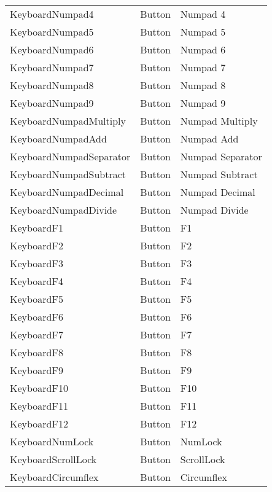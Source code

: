 \begin{center}
\begin{longtable}{ | l | l | p{9cm} |}
	KeyboardNumpad4			&	Button	&	Numpad 4\\
	KeyboardNumpad5			&	Button	&	Numpad 5\\
	KeyboardNumpad6			&	Button	&	Numpad 6\\
	KeyboardNumpad7			&	Button	&	Numpad 7\\
	KeyboardNumpad8			&	Button	&	Numpad 8\\
	KeyboardNumpad9			&	Button	&	Numpad 9\\
	KeyboardNumpadMultiply	&	Button	&	Numpad Multiply\\
	KeyboardNumpadAdd		&	Button	&	Numpad Add\\
	KeyboardNumpadSeparator	&	Button	&	Numpad Separator\\
	KeyboardNumpadSubtract	&	Button	&	Numpad Subtract\\
	KeyboardNumpadDecimal	&	Button	&	Numpad Decimal\\
	KeyboardNumpadDivide	&	Button	&	Numpad Divide\\
	KeyboardF1				&	Button	&	F1\\
	KeyboardF2				&	Button	&	F2\\
	KeyboardF3				&	Button	&	F3\\
	KeyboardF4				&	Button	&	F4\\
	KeyboardF5				&	Button	&	F5\\
	KeyboardF6				&	Button	&	F6\\
	KeyboardF7				&	Button	&	F7\\
	KeyboardF8				&	Button	&	F8\\
	KeyboardF9				&	Button	&	F9\\
	KeyboardF10				&	Button	&	F10\\
	KeyboardF11				&	Button	&	F11\\
	KeyboardF12				&	Button	&	F12\\
	KeyboardNumLock			&	Button	&	NumLock\\
	KeyboardScrollLock		&	Button	&	ScrollLock\\
	KeyboardCircumflex		&	Button	&	Circumflex\\
	\hline
	\end{longtable}
\end{center}



